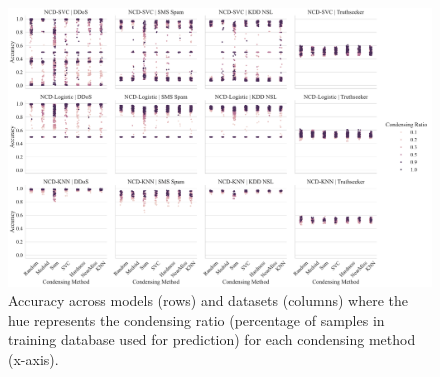 \documentclass[conference]{IEEEtran}
\begin{document}
\begin{figure}[htb]
    \centering
    \includegraphics[width=\textwidth]{figs/combined/condensing_ratio_vs_accuracy.pdf}
    \caption{Accuracy across models (rows) and datasets (columns) where the hue represents the condensing ratio (percentage of samples in training database used for prediction) for each condensing method (x-axis). }
    \label{fig:condense_acc_ratios}
\end{figure}
\end{document}
